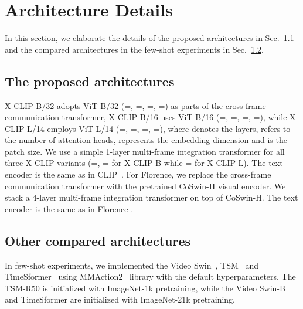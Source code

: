 \documentclass[runningheads]{llncs}
\begin{document}
\section{Architecture Details}\label{sec:architecture_detail}
In this section, we elaborate the details of the proposed architectures in Sec.~\ref{sec:our_architecture} and the compared architectures in the few-shot experiments in Sec.~\ref{sec:comparison_method}.
\subsection{The proposed architectures}\label{sec:our_architecture}
X-CLIP-B/32 adopts ViT-B/32  (=, =, =, =) as parts of the cross-frame communication transformer, X-CLIP-B/16 uses ViT-B/16 (=, =, =, =), while X-CLIP-L/14 employs ViT-L/14 (=, =, =, =), where  denotes the layers,  refers to the number of attention heads,  represents the embedding dimension and  is the patch size. We use a simple 1-layer multi-frame integration transformer for all three X-CLIP variants (=, = for X-CLIP-B while = for X-CLIP-L). The text encoder is the same as in CLIP~\cite{clip}. For Florence, we replace the cross-frame communication transformer with the pretrained CoSwin-H \cite{florence} visual encoder. We stack a 4-layer multi-frame integration transformer on top of CoSwin-H. The text encoder is the same as in Florence \cite{florence}.
\subsection{Other compared architectures}\label{sec:comparison_method}
In few-shot experiments, we implemented the Video Swin~\cite{liu2021video}, TSM~\cite{lin2019tsm} and TimeSformer~\cite{timesformer2021} using MMAction2~\cite{2020mmaction2} library with the default hyperparameters. The TSM-R50 is initialized with ImageNet-1k pretraining, while the Video Swin-B and TimeSformer are initialized with ImageNet-21k pretraining. 
\end{document}
